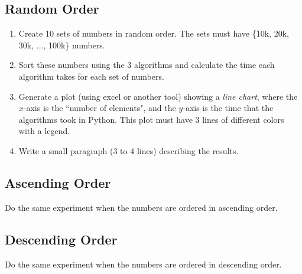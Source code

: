\documentclass{article}
\begin{document}
\subsection{Random Order}
\begin{enumerate}
  \item Create 10 sets of numbers in random order. The sets must have \{10k, 20k, 30k, ..., 100k\} numbers.
  
  \item Sort these numbers using the 3 algorithms and calculate the time each algorithm takes for each set of numbers.
  
  \item Generate a plot (using excel or another tool) showing a \emph{line chart}, where the $x$-axis is the ``number of elements", and the $y$-axis is the time that the algorithms took in Python. This plot must have 3 lines of different colors with a legend.
  
  \item Write a small paragraph (3 to 4 lines) describing the results.
\end{enumerate}

\subsection{Ascending Order}
Do the same experiment when the numbers are ordered in ascending order.

\subsection{Descending Order}
Do the same experiment when the numbers are ordered in descending order.
\end{document}
